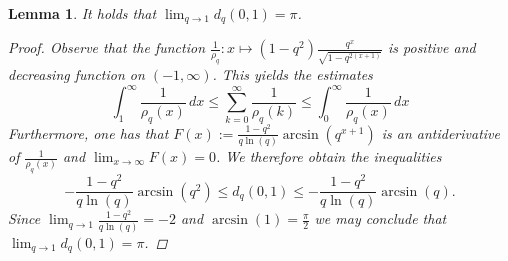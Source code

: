 \documentclass[11pt, reqno, a4paper, final]{amsart}
\theoremstyle{plain}
\newtheorem{lemma}[thm]{Lemma}
\theoremstyle{definition}
\renewcommand{\leq}{\leqslant}
\newcommand{\black}{\color{black}}
\begin{document}
\begin{lemma}
\label{Lemma:Diam}
{\black It holds that} $\lim_{q\to 1} d_q(0,1)=\pi$.
\begin{proof}
{\black Observe that the function} $\frac{1}{\rho_q}\colon x \mapsto (1-q^2)\frac{q^x}{\sqrt{1-q^{2(x+1)}}}$ is positive and decreasing function on {\black $(-1,\infty)$}. {\black This yields the estimates
 \begin{equation}\label{Eq:IntegralRule}
  \int_1^\infty \frac{1}{\rho_q(x)}\,dx \leq  \sum_{k=0}^\infty \frac{1}{\rho_q(k)} \leq  \int_0^\infty \frac{1}{\rho_q(x)}\,dx
 \end{equation}}
Furthermore, one has that $F(x):= \frac{1-q^2}{q\ln(q)}\arcsin(q^{x+1})$ is an antiderivative of $\frac{1}{\rho_q(x)}$ and  $\lim_{x\to \infty} F(x)=0$. {\black We therefore obtain the inequalities
\[
-\frac{1-q^2}{q\ln(q)}\arcsin(q^2) \leq d_q(0,1) 
\leq - \frac{1-q^2}{q\ln(q)}\arcsin(q) .
\]}
Since $\lim_{q\to 1}\frac{1-q^2}{q\ln(q)}=-2$ {\black and $\arcsin(1) = \frac{\pi}{2}$ we may conclude that $\lim_{q \to 1} d_q(0,1) = \pi$.}
\end{proof}
\end{lemma}
\end{document}
